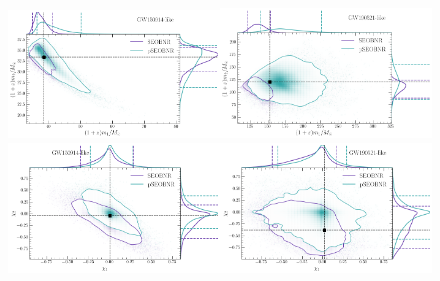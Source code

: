 \iffalse
\begin{figure}%
        \includegraphics[width=0.5\textwidth]{figures/GW150914_simulated_signal_0p1_gr_ngr_m1m2.png}\includegraphics[width=0.5\textwidth]{figures/GW190521_simulated_signal_0p1_gr_ngr_m1m2.png}
        \includegraphics[width=0.5\textwidth]{figures/GW150914_simulated_signal_0p1_gr_ngr_a1za2z.png}\includegraphics[width=0.5\textwidth]{figures/GW190521_simulated_signal_0p1_gr_ngr_a1za2z.png}

\end{figure}
